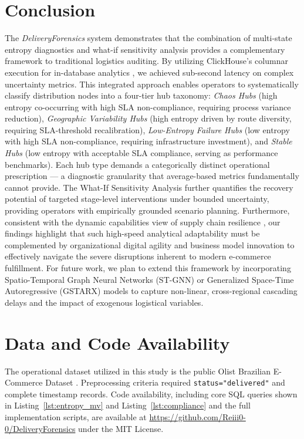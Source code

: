 \documentclass[conference]{IEEEtran}
\begin{document}
\section{Conclusion}
The \textit{DeliveryForensics} system demonstrates that the combination of multi-state entropy diagnostics and what-if sensitivity analysis provides a complementary framework to traditional logistics auditing. By utilizing ClickHouse's columnar execution for in-database analytics \cite{schulze2024clickhouse}, we achieved sub-second latency on complex uncertainty metrics. This integrated approach enables operators to systematically classify distribution nodes into a four-tier hub taxonomy: \textit{Chaos Hubs} (high entropy co-occurring with high SLA non-compliance, requiring process variance reduction), \textit{Geographic Variability Hubs} (high entropy driven by route diversity, requiring SLA-threshold recalibration), \textit{Low-Entropy Failure Hubs} (low entropy with high SLA non-compliance, requiring infrastructure investment), and \textit{Stable Hubs} (low entropy with acceptable SLA compliance, serving as performance benchmarks). Each hub type demands a categorically distinct operational prescription --- a diagnostic granularity that average-based metrics fundamentally cannot provide. The What-If Sensitivity Analysis further quantifies the recovery potential of targeted stage-level interventions under bounded uncertainty, providing operators with empirically grounded scenario planning. Furthermore, consistent with the dynamic capabilities view of supply chain resilience \cite{lenuwat2025supply, dubey2023dynamic}, our findings highlight that such high-speed analytical adaptability must be complemented by organizational digital agility and business model innovation to effectively navigate the severe disruptions inherent to modern e-commerce fulfillment. For future work, we plan to extend this framework by incorporating Spatio-Temporal Graph Neural Networks (ST-GNN) or Generalized Space-Time Autoregressive (GSTARX) models to capture non-linear, cross-regional cascading delays and the impact of exogenous logistical variables.

\section*{Data and Code Availability}
The operational dataset utilized in this study is the public Olist Brazilian E-Commerce Dataset \cite{olist2018}. Preprocessing criteria required \texttt{status="delivered"} and complete timestamp records. Code availability, including core SQL queries shown in Listing~\ref{lst:entropy_mv} and Listing~\ref{lst:compliance} and the full implementation scripts, are available at \url{https://github.com/Reiii0-0/DeliveryForensics} under the MIT License.



\end{document}
